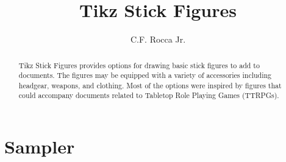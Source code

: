 \documentclass[twoside,12pt]{article}
\title{Tikz Stick Figures}
\author{C.F. Rocca Jr.}
\begin{document}
\maketitle

\begin{abstract}
    Tikz Stick Figures provides options for drawing basic stick figures to add to documents.  The figures may be equipped with a variety of accessories including headgear, weapons, and clothing.  Most of the options were inspired by figures that could accompany documents related to Tabletop Role Playing Games (TTRPGs).
\end{abstract}

\section{Sampler}
\end{document}
